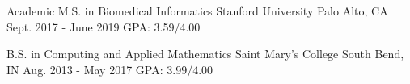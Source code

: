
\begin{cventries}
    \cventry
      {Academic M.S. in Biomedical Informatics}
      {Stanford University}
      {Palo Alto, CA}
      {Sept. 2017 - June 2019}
      {GPA: 3.59/4.00}
      
    \cventry
      {B.S. in Computing and Applied Mathematics}
      {Saint Mary's College}
      {South Bend, IN}
      {Aug. 2013 - May 2017}
      {GPA: 3.99/4.00}
\end{cventries}
\vspace{4pt}